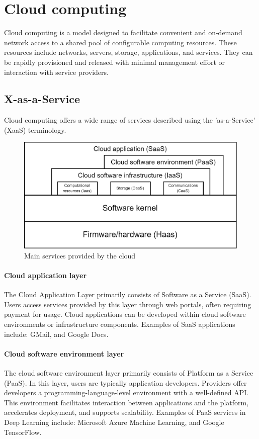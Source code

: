 \section{Cloud computing}

Cloud computing is a model designed to facilitate convenient and on-demand network access to a shared pool of configurable computing resources. 
These resources include networks, servers, storage, applications, and services. 
They can be rapidly provisioned and released with minimal management effort or interaction with service providers.

\subsection{X-as-a-Service}
Cloud computing offers a wide range of services described using the 'as-a-Service' (XaaS) terminology. 
\begin{figure}[H]
    \centering
    \includegraphics[width=0.5\linewidth]{images/xaas.png}
    \caption{Main services provided by the cloud}
\end{figure}

\paragraph*{Cloud application layer}
The Cloud Application Layer primarily consists of Software as a Service (SaaS). 
Users access services provided by this layer through web portals, often requiring payment for usage. 
Cloud applications can be developed within cloud software environments or infrastructure components.
Examples of SaaS applications include: GMail, and Google Docs.

\paragraph*{Cloud software environment layer}
The cloud software environment layer primarily consists of Platform as a Service (PaaS). 
In this layer, users are typically application developers. 
Providers offer developers a programming-language-level environment with a well-defined API. 
This environment facilitates interaction between applications and the platform, accelerates deployment, and supports scalability.
Examples of PaaS services in Deep Learning include: Microsoft Azure Machine Learning, and Google TensorFlow.

